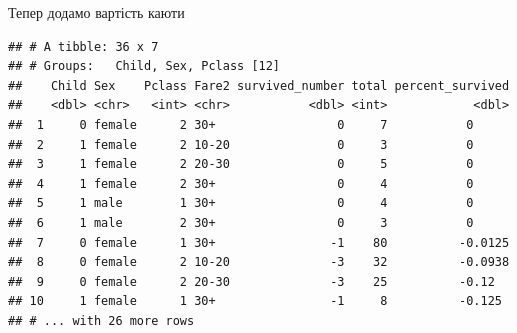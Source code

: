 \documentclass[ignorenonframetext,]{beamer}
\newenvironment{Shaded}{\begin{snugshade}}{\end{snugshade}}
\newcommand{\DataTypeTok}[1]{\textcolor[rgb]{0.13,0.29,0.53}{#1}}
\newcommand{\DecValTok}[1]{\textcolor[rgb]{0.00,0.00,0.81}{#1}}
\newcommand{\KeywordTok}[1]{\textcolor[rgb]{0.13,0.29,0.53}{\textbf{#1}}}
\newcommand{\NormalTok}[1]{#1}
\newcommand{\OperatorTok}[1]{\textcolor[rgb]{0.81,0.36,0.00}{\textbf{#1}}}
\newcommand{\StringTok}[1]{\textcolor[rgb]{0.31,0.60,0.02}{#1}}
\begin{document}
\begin{frame}[fragile]{Тепер додамо вартість каюти}
\protect\hypertarget{ux442ux435ux43fux435ux440-ux434ux43eux434ux430ux43cux43e-ux432ux430ux440ux442ux456ux441ux442ux44c-ux43aux430ux44eux442ux438}{}

\begin{Shaded}
\end{Shaded}

\begin{verbatim}
## # A tibble: 36 x 7
## # Groups:   Child, Sex, Pclass [12]
##    Child Sex    Pclass Fare2 survived_number total percent_survived
##    <dbl> <chr>   <int> <chr>           <dbl> <int>            <dbl>
##  1     0 female      2 30+                 0     7           0     
##  2     1 female      2 10-20               0     3           0     
##  3     1 female      2 20-30               0     5           0     
##  4     1 female      2 30+                 0     4           0     
##  5     1 male        1 30+                 0     4           0     
##  6     1 male        2 30+                 0     3           0     
##  7     0 female      1 30+                -1    80          -0.0125
##  8     0 female      2 10-20              -3    32          -0.0938
##  9     0 female      2 20-30              -3    25          -0.12  
## 10     1 female      1 30+                -1     8          -0.125 
## # ... with 26 more rows
\end{verbatim}

\end{frame}
\end{document}
